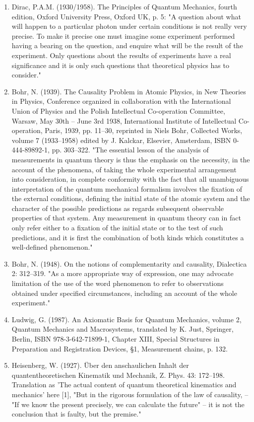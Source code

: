 \begin{enumerate}
\item Dirac, P.A.M. (1930/1958). The Principles of Quantum Mechanics, fourth edition, Oxford University Press, Oxford UK, p. 5: "A question about what will happen to a particular photon under certain conditions is not really very precise. To make it precise one must imagine some experiment performed having a bearing on the question, and enquire what will be the result of the experiment. Only questions about the results of experiments have a real significance and it is only such questions that theoretical physics has to consider."
\item Bohr, N. (1939). The Causality Problem in Atomic Physics, in New Theories in Physics, Conference organized in collaboration with the International Union of Physics and the Polish Intellectual Co-operation Committee, Warsaw, May 30th – June 3rd 1938, International Institute of Intellectual Co-operation, Paris, 1939, pp. 11–30, reprinted in Niels Bohr, Collected Works, volume 7 (1933–1958) edited by J. Kalckar, Elsevier, Amsterdam, ISBN 0-444-89892-1, pp. 303–322. "The essential lesson of the analysis of measurements in quantum theory is thus the emphasis on the necessity, in the account of the phenomena, of taking the whole experimental arrangement into consideration, in complete conformity with the fact that all unambiguous interpretation of the quantum mechanical formalism involves the fixation of the external conditions, defining the initial state of the atomic system and the character of the possible predictions as regards subsequent observable properties of that system. Any measurement in quantum theory can in fact only refer either to a fixation of the initial state or to the test of such predictions, and it is first the combination of both kinds which constitutes a well-defined phenomenon."
\item Bohr, N. (1948). On the notions of complementarity and causality, Dialectica 2: 312–319. "As a more appropriate way of expression, one may advocate limitation of the use of the word phenomenon to refer to observations obtained under specified circumstances, including an account of the whole experiment."
\item Ludwig, G. (1987). An Axiomatic Basis for Quantum Mechanics, volume 2, Quantum Mechanics and Macrosystems, translated by K. Just, Springer, Berlin, ISBN 978-3-642-71899-1, Chapter XIII, Special Structures in Preparation and Registration Devices, §1, Measurement chains, p. 132.
\item Heisenberg, W. (1927). Über den anschaulichen Inhalt der quantentheoretischen Kinematik und Mechanik, Z. Phys. 43: 172–198. Translation as 'The actual content of quantum theoretical kinematics and mechanics' here [1], "But in the rigorous formulation of the law of causality, – "If we know the present precisely, we can calculate the future" – it is not the conclusion that is faulty, but the premise."

\end{enumerate}
